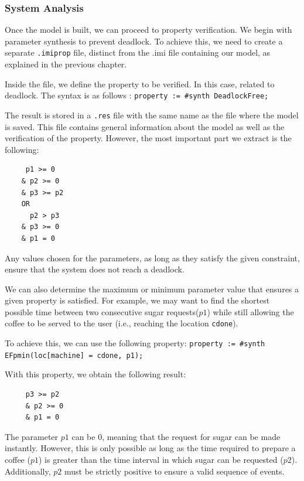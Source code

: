 \subsubsection{System Analysis}

Once the model is built, we can proceed to property verification. We begin with parameter synthesis to prevent deadlock. To achieve this, we need to create a separate \texttt{.imiprop} file, distinct from the .imi file containing our model, as explained in the previous chapter.


Inside the file, we define the property to be verified. In this case, related to deadlock. The syntax is as follows : \texttt{property := \#synth DeadlockFree;}

The result is stored in a \texttt{.res} file with the same name as the file where the model is saved. This file contains general information about the model as well as the verification of the property. However, the most important part we extract is the following:

\begin{verbatim}
     p1 >= 0
    & p2 >= 0
    & p3 >= p2
    OR
      p2 > p3
    & p3 >= 0
    & p1 = 0
\end{verbatim}

Any values chosen for the parameters, as long as they satisfy the given constraint, ensure that the system does not reach a deadlock.

We can also determine the maximum or minimum parameter value that ensures a given property is satisfied. For example, we may want to find the shortest possible time between two consecutive sugar requests(\( p1 \)) while still allowing the coffee to be served to the user (i.e., reaching the location \texttt{cdone}).

To achieve this, we can use the following property: 
\texttt{property := \#synth EFpmin(loc[machine] = cdone, p1);}

With this property, we obtain the following result:

\begin{verbatim}
     p3 >= p2
     & p2 >= 0
     & p1 = 0
\end{verbatim}

The parameter \( p1 \) can be 0, meaning that the request for sugar can be made instantly. However, this is only possible as long as the time required to prepare a coffee (\( p1 \)) is greater than the time interval in which sugar can be requested (\( p2 \)). Additionally, \( p2 \) must be strictly positive to ensure a valid sequence of events.

